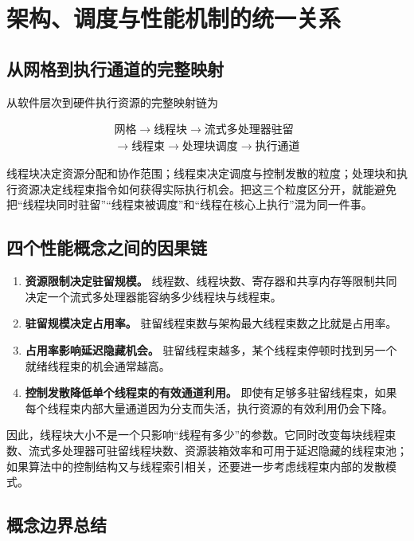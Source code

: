 \section{架构、调度与性能机制的统一关系}

\subsection{从网格到执行通道的完整映射}

从软件层次到硬件执行资源的完整映射链为

\[
\boxed{
\begin{array}{c}
\text{网格}\rightarrow\text{线程块}\rightarrow\text{流式多处理器驻留}\\[2mm]
\rightarrow\text{线程束}\rightarrow\text{处理块调度}\rightarrow\text{执行通道}
\end{array}
}
\]

线程块决定资源分配和协作范围；线程束决定调度与控制发散的粒度；处理块和执行资源决定线程束指令如何获得实际执行机会。把这三个粒度区分开，就能避免把“线程块同时驻留”“线程束被调度”和“线程在核心上执行”混为同一件事。

\subsection{四个性能概念之间的因果链}

\begin{enumerate}
  \item \textbf{资源限制决定驻留规模。} 线程数、线程块数、寄存器和共享内存等限制共同决定一个流式多处理器能容纳多少线程块与线程束。
  \item \textbf{驻留规模决定占用率。} 驻留线程束数与架构最大线程束数之比就是占用率。
  \item \textbf{占用率影响延迟隐藏机会。} 驻留线程束越多，某个线程束停顿时找到另一个就绪线程束的机会通常越高。
  \item \textbf{控制发散降低单个线程束的有效通道利用。} 即使有足够多驻留线程束，如果每个线程束内部大量通道因为分支而失活，执行资源的有效利用仍会下降。
\end{enumerate}

因此，线程块大小不是一个只影响“线程有多少”的参数。它同时改变每块线程束数、流式多处理器可驻留线程块数、资源装箱效率和可用于延迟隐藏的线程束池；如果算法中的控制结构又与线程索引相关，还要进一步考虑线程束内部的发散模式。

\subsection{概念边界总结}

